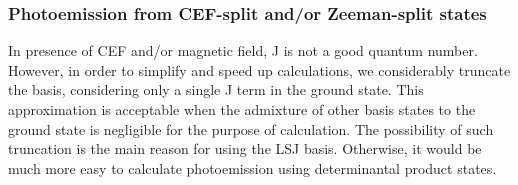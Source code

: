 \documentclass[a4paper,oneside,12pt]{extarticle}
\begin{document}
%






\subsubsection {Photoemission from CEF-split and/or Zeeman-split states}
%
In presence of CEF and/or magnetic field, J is not a good quantum number. However, in order to simplify and speed up calculations, we considerably truncate the basis, considering only a single J term in the ground state. This approximation is acceptable when the admixture of other basis states to the ground state is negligible for the purpose of calculation. The possibility of such truncation is the main reason for using the LSJ basis. Otherwise, it would be much more easy to calculate photoemission using determinantal product states.
\end{document}
